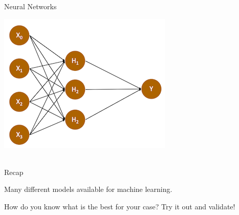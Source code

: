 \documentclass[handout]{beamer}
\begin{document}
\begin{frame}{Neural Networks}
	
	\begin{center}
		\includegraphics{../pictures/neuralnetwork_hiddenlayer.png} \\\
	\end{center}
	
	\begin{tiny}
	\end{tiny}
	
	
	
	
	
\end{frame}


\begin{frame}{Recap}
	
	Many different models available for machine learning.
	
	How do you know what is the best for your case? Try it out and validate!
	
\end{frame}
\end{document}
